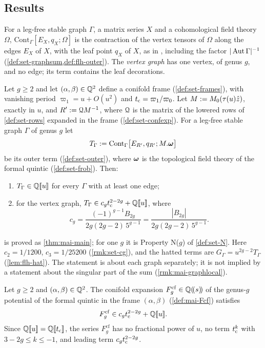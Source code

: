 
\subsection{Results}
\label{sec:int-results}

For a leg-free stable graph $\Gamma$, a matrix series $X$ and a cohomological field theory $\Omega$, $\mathrm{Cont}_\Gamma[E_X,q_X;\Omega]$ is the contraction of the vertex tensors of $\Omega$ along the edges $E_X$ of $X$, with the leaf point $q_X$ of $X$, as in \cite[Defs.~2.2, 2.13]{PPZ15}, including the factor $|\operatorname{Aut}\Gamma|^{-1}$ (\cref{def:set-graphsum,def:flh-outer}). The \emph{vertex graph} has one vertex, of genus $g$, and no edge; its term contains the leaf decorations.

\begin{thm}[Theorem~A]
\label{thm:int-main}
Let $g\geq2$ and let $(\alpha,\beta)\in\mathbb{Q}^2$ define a conifold frame (\cref{def:set-frames}), with vanishing period $\varpi_1=u+O(u^2)$ and $t_{\mathrm{c}}=\varpi_1/\varpi_0$. Let $M:=M_{0}(\tau(u)\hat{z})$, exactly in $u$, and $R':=\mathcal{Q} M^{-1}$, where $\mathcal{Q}$ is the matrix of the lowered rows of \cref{def:set-rows} expanded in the frame (\cref{def:set-confexp}). For a leg-free stable graph $\Gamma$ of genus $g$ let
\[
T_\Gamma:=\mathrm{Cont}_\Gamma\bigl[E_{R'},q_{R'};M.\boldsymbol{\omega}\bigr]
\]
be its outer term (\cref{def:set-outer}), where $\boldsymbol{\omega}$ is the topological field theory of the formal quintic (\cref{def:set-frob}). Then:
\begin{enumerate}
\item $T_\Gamma\in\mathbb{Q}[\![ u ]\!]$ for every $\Gamma$ with at least one edge;
\item for the vertex graph, $T_\Gamma\in c_gt_{\mathrm{c}}^{2-2g}+\mathbb{Q}[\![ u ]\!]$, where
\[
c_g=\frac{(-1)^{g-1}B_{2g}}{2g(2g-2)\,5^{g-1}}=\frac{|B_{2g}|}{2g(2g-2)\,5^{g-1}} .
\]
\end{enumerate}
\end{thm}

 is proved as \cref{thm:mai-main}; for one $g$ it is Property N($g$) of \cref{def:set-N}. Here $c_2=1/1200$, $c_3=1/25200$ (\cref{rmk:set-cg}), and the hatted terms are $G_\Gamma=u^{2g-2}T_\Gamma$ (\cref{lem:flh-hat}). The statement is about each graph separately; it is not implied by a statement about the singular part of the sum (\cref{rmk:mai-graphlocal}).

\begin{cor}
\label{cor:int-gap}
Let $g\geq2$ and $(\alpha,\beta)\in\mathbb{Q}^2$. The conifold expansion $F_g^{\mathrm{cf}}\in\mathbb{Q}(\!(s)\!)$ of the genus-$g$ potential of the formal quintic in the frame $(\alpha,\beta)$ (\cref{def:mai-Fcf}) satisfies
\[
F_g^{\mathrm{cf}}\in c_gt_{\mathrm{c}}^{2-2g}+\mathbb{Q}[\![ u ]\!] .
\]
Since $\mathbb{Q}[\![ u ]\!]=\mathbb{Q}[\![ t_{\mathrm{c}} ]\!]$, the series $F_g^{\mathrm{cf}}$ has no fractional power of $u$, no term $t_{\mathrm{c}}^k$ with $3-2g\leq k\leq-1$, and leading term $c_gt_{\mathrm{c}}^{2-2g}$.
\end{cor}

